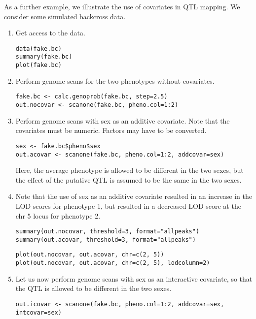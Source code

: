 \documentclass[10pt,letterpaper]{article}
\newcommand{\usercolor}{\color [named]{BlueViolet}}
\begin{document}
\noindent As a further example, we illustrate the use of covariates in
QTL mapping.  We consider some simulated backcross data.

\begin{enumerate}

\item Get access to the data.

\usercolor
\verb|data(fake.bc)| \\
\verb|summary(fake.bc)| \\
\verb|plot(fake.bc)| 
\normalcolor

\item Perform genome scans for the two phenotypes without covariates.

\usercolor
\verb|fake.bc <- calc.genoprob(fake.bc, step=2.5)| \\
\verb|out.nocovar <- scanone(fake.bc, pheno.col=1:2)|
\normalcolor

\item Perform genome scans with sex as an additive covariate.
Note that the covariates must be numeric.  Factors may have to be
converted.

\usercolor
\verb|sex <- fake.bc$pheno$sex| \\
\verb|out.acovar <- scanone(fake.bc, pheno.col=1:2, addcovar=sex)|
\normalcolor

Here, the average phenotype is allowed to be different in the two
sexes, but the effect of the putative QTL is assumed to be the same in
the two sexes.

\item Note that the use of sex as an additive covariate resulted in an
  increase in the LOD scores for phenotype 1, but resulted  in a
  decreased LOD score at the chr 5 locus for phenotype 2.

\usercolor
\verb|summary(out.nocovar, threshold=3, format="allpeaks")| \\
\verb|summary(out.acovar, threshold=3, format="allpeaks")| 

\verb|plot(out.nocovar, out.acovar, chr=c(2, 5))| \\
\verb|plot(out.nocovar, out.acovar, chr=c(2, 5), lodcolumn=2)| 
\normalcolor

\item Let us now perform genome scans with sex as an interactive
  covariate, so that the QTL is allowed to be different in the two sexes.

\usercolor
\verb|out.icovar <- scanone(fake.bc, pheno.col=1:2, addcovar=sex, intcovar=sex)|
\normalcolor


\end{enumerate}
\end{document}

